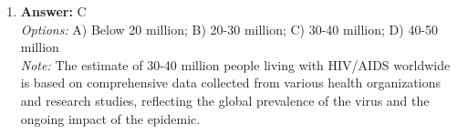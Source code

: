 \documentclass[12pt]{article}
\begin{document}
\begin{enumerate}[label=\arabic*.]
\\ \textit{Note:} Liberal Internationalists argue that international institutions are important to US grand strategy because they facilitate cooperation among states, promote stability, and help advance American interests through the establishment of norms and rules that align with US values and objectives.
\item \textbf{Answer:} C
\\ \textit{Options:} A) Below 20 million; B) 20-30 million; C) 30-40 million; D) 40-50 million
\\ \textit{Note:} The estimate of 30-40 million people living with HIV/AIDS worldwide is based on comprehensive data collected from various health organizations and research studies, reflecting the global prevalence of the virus and the ongoing impact of the epidemic.
\end{enumerate}
\end{document}
